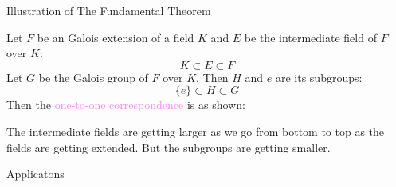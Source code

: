 \documentclass{beamer}
\begin{document}
\begin{frame}{Illustration of The Fundamental Theorem}
  \begin{minipage}{0.65\textwidth}
  Let \(F\) be an Galois extension of a field \(K\) and \(E\) be the intermediate field of \(F\) over \(K\):
  \[
    K \subset E \subset F
  \]
\noindent
  Let \(G\) be the Galois group of \(F\) over \(K\). Then \(H\) and \({e}\) are its subgroups:
  \[
    \{e\} \subset H \subset G
  \]
  Then the \textcolor{violet}{one-to-one correspondence} is as shown:
\end{minipage}
\begin{minipage}{0.3\textwidth}

  \begin{tcolorbox}[colback=white, colback=orange!20, colframe=orange!80!black, title={\footnotesize \textcolor{white}{Galois-correspondence}}, width=4cm]
  \end{tcolorbox}
\end{minipage}

\vspace{5mm}

 \begin{tcolorbox}[colback=white, colframe=blue!40, boxsep=0mm]
\begin{definition}[Remark]
  The intermediate fields are getting larger as we go from bottom to top  as the fields are getting extended. But the subgroups are getting smaller.
\end{definition}
\end{tcolorbox}
\end{frame}

\begin{frame}[plain]
  \LARGE \centering
  Applicatons
  \end{frame}
\end{document}
